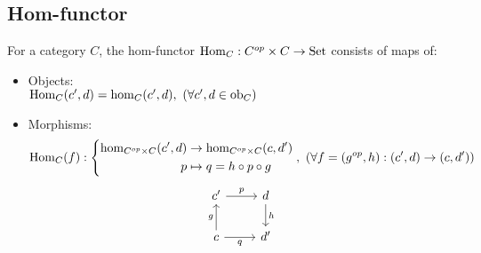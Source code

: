 \subsection*{Hom-functor}
For a category $C$, the hom-functor $\mathrm{Hom}_C : C^{op}\times C \to
\mathrm{Set}$ consists of maps of: \parencite{maclane:working_mathematician}
\begin{itemize}
  \item Objects:\\
    $\mathrm{Hom}_C (c', d) = \hom_C (c', d),
      \ (\forall c', d\in \mathrm{ob}_C)$
  \item Morphisms:
    \[
      \mathrm{Hom}_C (f) : \left\{
      \begin{aligned}
        \hom_{C^{op}\times C}(c', d) &\to
          \hom_{C^{op}\times C}(c, d')\\
        p &\mapsto q = h\circ p\circ g
      \end{aligned}
      \right.
      ,\ (\forall f=(g^{op}, h): (c', d)\to (c, d'))
    \]
    \[
      \begin{tikzcd}
      {c'} & d \\
      c & {d'}
      \arrow["g", from=2-1, to=1-1]
      \arrow["h", from=1-2, to=2-2]
      \arrow["p", from=1-1, to=1-2]
      \arrow["q"', from=2-1, to=2-2]
      \end{tikzcd}
    \]
\end{itemize}